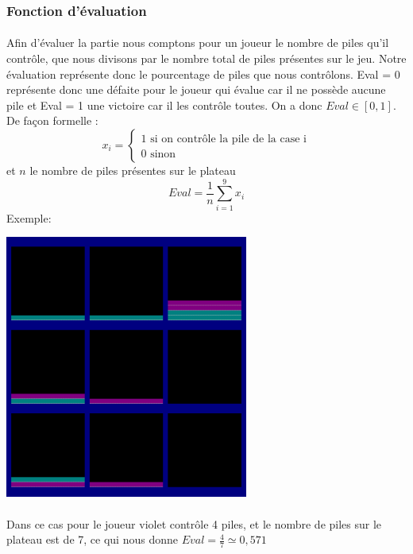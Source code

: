 \documentclass[article, backcover, french, nodocumentinfo]{upmethodology-document}
\begin{document}
			\subsubsection{Fonction d'évaluation}
				\paragraph{}
					Afin d'évaluer la partie nous comptons pour un joueur  le nombre de piles qu’il contrôle, que nous divisons par le nombre total de piles présentes sur le jeu. Notre évaluation représente donc le pourcentage de piles que nous contrôlons. Eval = 0 représente donc une défaite pour le joueur qui évalue car il ne possède aucune pile et Eval = 1 une victoire car il les contrôle toutes. On a donc $Eval \in [0,1]$.\\
					De façon formelle :
					\[
					x_{i} = \left\{
					\begin{array}{ll}
						1 \mbox{ si  on contrôle la pile de la case i} \\
						0  \mbox{ sinon}
					\end{array}
					\right.
					\]
					et $n$ le nombre de piles présentes sur le plateau
					\[Eval = \frac{1}{n}  \sum_{i = 1}^{9} x_{i}\]
					Exemple:
					\begin{center}
						\includegraphics[width=0.6\textwidth]{figures/Eval.png}
					\end{center}
				\paragraph{}
					Dans ce cas pour le joueur violet contrôle 4 piles, et le nombre de piles sur le plateau est de 7, ce qui nous donne $Eval = \frac{4}{7} \simeq 0,571$
\end{document}
